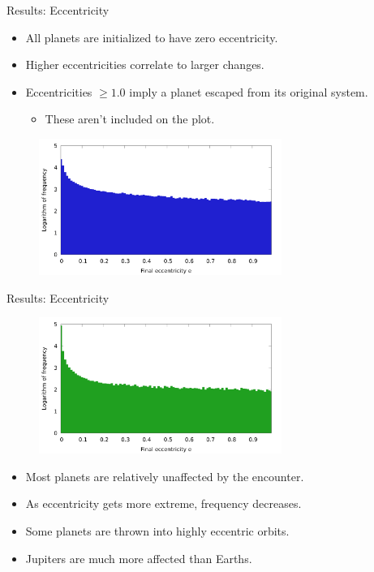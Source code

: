 \documentclass{beamer}
\begin{document}
\begin{frame}{Results: Eccentricity}
    \begin{itemize}
        \item All planets are initialized to have zero eccentricity.
        \item Higher eccentricities correlate to larger changes.
        \item Eccentricities $\ge 1.0$ imply a planet escaped from its
            original system.
            \begin{itemize}
                \item These aren't included on the plot.
            \end{itemize}
    \end{itemize}
    \begin{figure}
        \centering
        \includegraphics[height=1.75in]{eccentricity_jupiter_1000.png}
    \end{figure}
\end{frame}

\begin{frame}{Results: Eccentricity}
    \begin{figure}
        \centering
        \includegraphics[height=1.75in]{eccentricity_earth_1000.png}
    \end{figure}
    \begin{itemize}
        \item Most planets are relatively unaffected by the encounter.
        \item As eccentricity gets more extreme, frequency decreases.
        \item Some planets are thrown into highly eccentric orbits.
        \item Jupiters are much more affected than Earths.
    \end{itemize}
\end{frame}
\end{document}
